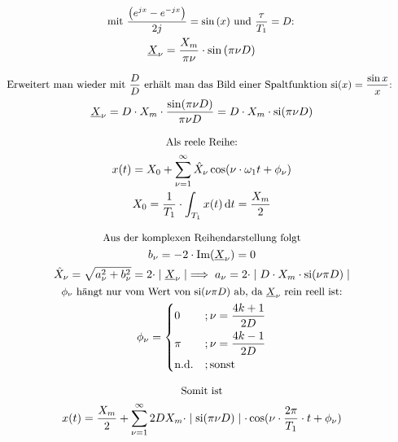 \documentclass[a4paper, 12pt]{article}
\newcommand*\dif{\mathop{}\!\mathrm{d}}
\begin{document}
    \begin{gather*}
      \text{\small{ mit $ \frac{\left ( e^{jx} - e^{-jx} \right )}{2 j} = \sin{(x)}$ und $\frac{\tau}{T_1} = D$: }}\notag\\
      \underline{X}_\nu = \frac{X_m}{\pi \nu } \cdot \sin{(\pi \nu D)}
    \end{gather*}

    \begin{gather*}
        \text{\small Erweitert man wieder mit $\frac{D}{D}$ erhält man das Bild einer Spaltfunktion $\text{si}(x)=\frac{\sin x }{x}$: }\notag\\
        \underline{X}_\nu = D \cdot X_m \cdot \frac{\sin(\pi \nu D)}{\pi \nu D} = D \cdot X_m \cdot \text{si}(\pi \nu D)
    \end{gather*}

    \begin{gather*}
        \text{\small Als reele Reihe:}\notag\\
        x(t) = X_0 + \sum^{\infty}_{\nu=1}{\hat{X}_\nu \cos(\nu \cdot \omega_1 t + \phi_\nu )}\\
        X_0 = \frac{1}{T_1} \cdot \int_{T_1}{x(t) \dif t} = \frac{X_m}{2}\\
    \end{gather*}

    \begin{gather*}
      \text{\small Aus der komplexen Reihendarstellung folgt}\notag\\
      b_\nu = -2 \cdot \text{Im}(\underline{X}_\nu) = 0\\
      \hat{X}_\nu = \sqrt{a^2_\nu + b^2_\nu} = 2 \cdot \mid \underline{X}_\nu\mid \implies a_\nu = 2 \cdot \mid D \cdot X_m \cdot \text{si}(\nu \pi D)\mid \\
      \text{\small $\phi_\nu$ hängt nur vom Wert von $\text{si}{(\nu \pi D)}$ ab, da $\underline{X}_\nu$ rein reell ist:}\notag\\
      \phi_\nu =
      \begin{dcases}
      0 & ; \nu = \frac{4k+1}{2D} \\
      \pi & ; \nu =\frac{4k-1}{2D} \\
      \text{n.d.} & ; \text{sonst}
      \end{dcases}
    \end{gather*}

    \begin{gather*}
      \text{\small Somit ist}\notag\\
      x(t) = \frac{X_m}{2} + \sum^{\infty}_{\nu=1}{2 D X_m \cdot \mid \text{si}(\pi \nu D) \mid \cdot \cos(\nu \cdot \frac{2\pi}{T_1} \cdot t + \phi_\nu)}
    \end{gather*}
\end{document}
